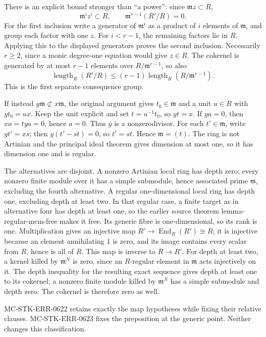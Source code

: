There is an explicit bound stronger than ``a power'': since \(\mathfrak m z\subset R\), \[
 \mathfrak m^i z^i\subset R,\qquad
 \mathfrak m^{r-1}(R'/R)=0.
\] For the first inclusion write a generator of \(\mathfrak m^i\) as a product of \(i\) elements of \(\mathfrak m\), and group each factor with one \(z\). For \(i<r-1\), the remaining factors lie in \(R\). Applying this to the displayed generators proves the second inclusion. Necessarily \(r\ge2\), since a monic degree-one equation would give \(z\in R\). The cokernel is generated by at most \(r-1\) elements over \(R/\mathfrak m^{r-1}\), so also \[
 \operatorname{length}_R(R'/R)
 \le (r-1)\operatorname{length}_R(R/\mathfrak m^{r-1}).
\] This is the first separate consequence group.

If instead \(y\mathfrak m\not\subset x\mathfrak m\), the original argument gives \(t_0\in\mathfrak m\) and a unit \(u\in R\) with \(yt_0=ux\). Keep the unit explicit and set \(t=u^{-1}t_0\), so \(yt=x\). If \(ya=0\), then \(xa=tya=0\), hence \(a=0\). Thus \(y\) is a nonzerodivisor. For each \(t'\in\mathfrak m\), write \(yt'=xs\); then \(y(t'-st)=0\), so \(t'=st\). Hence \(\mathfrak m=(t)\). The ring is not Artinian and the principal ideal theorem gives dimension at most one, so it has dimension one and is regular.

The alternatives are disjoint. A nonzero Artinian local ring has depth zero; every nonzero finite module over it has a simple submodule, hence associated prime \(\mathfrak m\), excluding the fourth alternative. A regular one-dimensional local ring has depth one, excluding depth at least two. In that regular case, a finite target as in alternative four has depth at least one, so the earlier source theorem lemma-regular-mcm-free makes it free. Its generic fibre is one-dimensional, so its rank is one. Multiplication gives an injective map \(R'\to\operatorname{End}_R(R')\cong R\); it is injective because an element annihilating \(1\) is zero, and its image contains every scalar from \(R\), hence is all of \(R\). This map is inverse to \(R\to R'\). For depth at least two, a kernel killed by \(\mathfrak m^N\) is zero, since an \(R\)-regular element in \(\mathfrak m\) acts injectively on it. The depth inequality for the resulting exact sequence gives depth at least one to its cokernel; a nonzero finite module killed by \(\mathfrak m^N\) has a simple submodule and depth zero. The cokernel is therefore zero as well.

MC-STK-ERR-0622 retains exactly the map hypotheses while fixing their relative clauses. MC-STK-ERR-0623 fixes the preposition at the generic point. Neither changes this classification.

